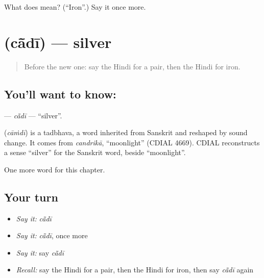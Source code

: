\begin{tcolorbox}[breakable,colback=teal!4,colframe=teal!35!black,title={Before you move on}]
What does  mean? (\textquotedblleft{}Iron\textquotedblright{}.) Say it once more.
\end{tcolorbox}
\section[\texorpdfstring{\hi{चाँदी} (cā̃dī)}{चाँदी (cā̃dī)}]{ (cā̃dī) — silver}

\label{lesson:HI-C246-cadi}



\begin{quote}
Before the new one: say the Hindi for a pair, then the Hindi for iron.
\end{quote}

\subsection*{You'll want to know: }
\textbf{} — \emph{cā̃dī} — \textquotedblleft{}silver\textquotedblright{}.

\begin{cousinweb}
\textbf{} (\emph{cāṁdī}) is a tadbhava, a word inherited from Sanskrit and reshaped by sound change. It comes from \emph{candrikā}, \textquotedblleft{}moonlight\textquotedblright{} (CDIAL 4669). CDIAL reconstructs a sense \textquotedblleft{}silver\textquotedblright{} for the Sanskrit word, beside \textquotedblleft{}moonlight\textquotedblright{}.
\end{cousinweb}

\begin{grammarlens}[title={What you've built}]
One more word for this chapter.
\end{grammarlens}

\subsection*{Your turn}
\begin{itemize}
\raggedright
  \item \emph{Say it:} \emph{cā̃dī}
  \item \emph{Say it:} \emph{cā̃dī}, once more
  \item \emph{Say it:} say \emph{cā̃dī}
  \item \emph{Recall:} say the Hindi for a pair, then the Hindi for iron, then say \emph{cā̃dī} again
\end{itemize}

